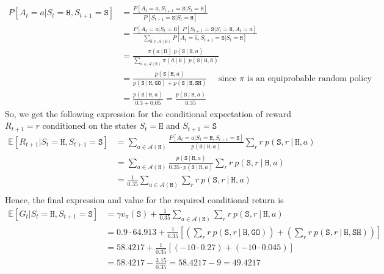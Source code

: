 \documentclass[11pt]{article}
\begin{document}
    \begin{align*}
        P[A_{t} = a | S_{t} = \texttt{H}, S_{t+1} = \texttt{S}] &= \frac{P[A_{t} = a, S_{t+1} = \texttt{S} | S_{t} = \texttt{H}]}{P[S_{t+1} = \texttt{S} | S_{t} = \texttt{H}]} \\
        &= \frac{P[A_{t} = a | S_{t} = \texttt{H}] \ P[S_{t+1} = \texttt{S} | S_{t} = \texttt{H}, A_{t} = a]}{\sum_{\hat{a} \in \mathcal{A}(\texttt{H})} P[A_{t} = \hat{a}, S_{t+1} = \texttt{S} | S_{t} = \texttt{H}]} \\
        &= \frac{\pi(a \ | \ \texttt{H}) \ p(\texttt{S} \ | \ \texttt{H}, a)}{\sum_{\hat{a} \in \mathcal{A}(\texttt{H})} \pi(\hat{a} \ | \ \texttt{H}) \ p(\texttt{S} \ | \ \texttt{H}, \hat{a})} \\
        &= \frac{p(\texttt{S} \ | \ \texttt{H}, a)}{p(\texttt{S} \ | \ \texttt{H}, \texttt{GO}) + p(\texttt{S} \ | \ \texttt{H}, \texttt{SH})} \quad \text{ since $\pi$ is an equiprobable random policy} \\
        &= \frac{p(\texttt{S} \ | \ \texttt{H}, a)}{0.3 + 0.05} = \frac{p(\texttt{S} \ | \ \texttt{H}, a)}{0.35}
    \end{align*}
    So, we get the following expression for the conditional expectation of reward $R_{t+1} = r$ conditioned on the states $S_{t} = \texttt{H}$ and $S_{t+1} = \texttt{S}$
    \begin{align*}
        \mathbb{E}[R_{t+1} | S_{t} = \texttt{H}, S_{t+1} = \texttt{S}] &= \sum_{a \in \mathcal{A}(\texttt{H})} \frac{P[A_{t} = a | S_{t} = \texttt{H}, S_{t+1} = \texttt{S}]}{p(\texttt{S} \ | \ \texttt{H}, a)} \sum_{r} r \ p(\texttt{S}, r \ | \ \texttt{H}, a) \\
        &= \sum_{a \in \mathcal{A}(\texttt{H})} \frac{p(\texttt{S} \ | \ \texttt{H}, a)}{0.35 \cdot p(\texttt{S} \ | \ \texttt{H}, a)} \sum_{r} r \ p(\texttt{S}, r \ | \ \texttt{H}, a) \\
        &= \frac{1}{0.35} \sum_{a \in \mathcal{A}(\texttt{H})} \sum_{r} r \ p(\texttt{S}, r \ | \ \texttt{H}, a) \\
    \end{align*}
    Hence, the final expression and value for the required conditional return is
    \begin{align*}
        \mathbb{E}[G_{t} | S_{t} = \texttt{H}, S_{t+1} = \texttt{S}] &= \gamma v_{\pi}(\texttt{S}) + \frac{1}{0.35} \sum_{a \in \mathcal{A}(\texttt{H})} \sum_{r} r \ p(\texttt{S}, r \ | \ \texttt{H}, a) \\
        &= 0.9 \cdot 64.913 + \frac{1}{0.35} \left[ \left(\sum_{r} r \ p(\texttt{S}, r \ | \ \texttt{H}, \texttt{GO}) \right) + \left(\sum_{r} r \ p(\texttt{S}, r \ | \ \texttt{H}, \texttt{SH}) \right)\right] \\
        &= 58.4217 + \frac{1}{0.35} \left[ (-10 \cdot 0.27) + (-10 \cdot 0.045) \right] \\
        &= 58.4217 - \frac{3.15}{0.35} = 58.4217 - 9 = 49.4217
    \end{align*}
\end{document}
